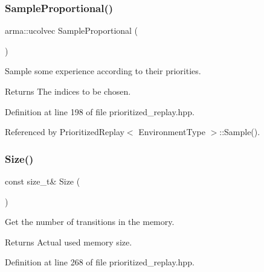 \subsubsection{Sample\+Proportional()}
{\footnotesize\ttfamily arma\+::ucolvec Sample\+Proportional (\begin{DoxyParamCaption}{ }\end{DoxyParamCaption})\hspace{0.3cm}{\ttfamily [inline]}}



Sample some experience according to their priorities. 

\begin{DoxyReturn}{Returns}
The indices to be chosen. 
\end{DoxyReturn}


Definition at line 198 of file prioritized\+\_\+replay.\+hpp.



Referenced by Prioritized\+Replay$<$ Environment\+Type $>$\+::\+Sample().

\mbox{\label{classmlpack_1_1rl_1_1PrioritizedReplay_ab8983dc8f7847b4c77148b86d0e7fc8d}} 
\subsubsection{Size()}
{\footnotesize\ttfamily const size\+\_\+t\& Size (\begin{DoxyParamCaption}{ }\end{DoxyParamCaption})\hspace{0.3cm}{\ttfamily [inline]}}



Get the number of transitions in the memory. 

\begin{DoxyReturn}{Returns}
Actual used memory size. 
\end{DoxyReturn}


Definition at line 268 of file prioritized\+\_\+replay.\+hpp.

\mbox{\label{classmlpack_1_1rl_1_1PrioritizedReplay_ab17ee90540cf7b26647b57acf16116d5}} 
